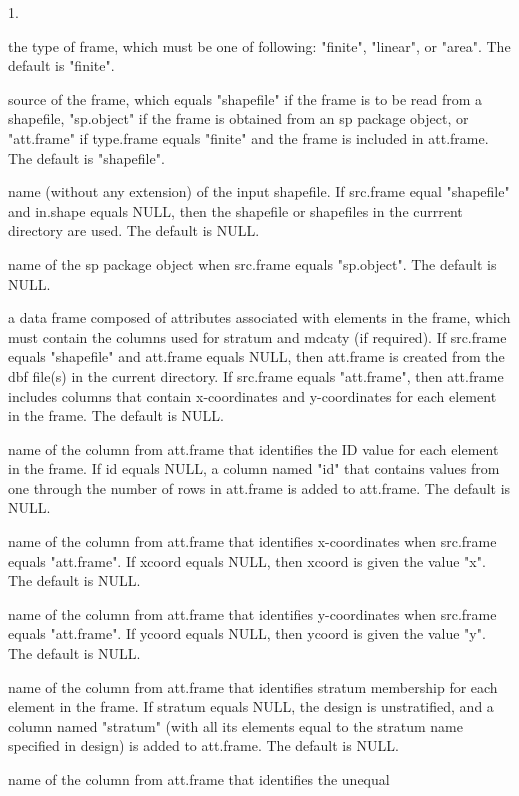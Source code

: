 \begin{Arguments}
\begin{ldescription}
1.
\item[\code{type.frame}] the type of frame, which must be one of following: "finite",
"linear", or "area".  The default is "finite".
\item[\code{src.frame}] source of the frame, which equals "shapefile" if the frame is
to be read from a shapefile, "sp.object" if the frame is obtained from an sp
package object, or "att.frame" if type.frame equals "finite" and the frame
is included in att.frame.  The default is "shapefile".
\item[\code{in.shape}] name (without any extension) of the input shapefile.  If
src.frame equal "shapefile" and in.shape equals NULL, then the shapefile or
shapefiles in the currrent directory are used.  The default is NULL.
\item[\code{sp.object}] name of the sp package object when src.frame equals
"sp.object".  The default is NULL.
\item[\code{att.frame}] a data frame composed of attributes associated with elements
in the frame, which must contain the columns used for stratum and mdcaty (if 
required).  If src.frame equals "shapefile" and att.frame equals NULL, then
att.frame is created from the dbf file(s) in the current directory.  If
src.frame equals "att.frame", then att.frame includes columns that contain
x-coordinates and y-coordinates for each element in the frame.  The default
is NULL.
\item[\code{id}] name of the column from att.frame that identifies the ID value for
each element in the frame.  If id equals NULL, a column named "id" that
contains values from one through the number of rows in att.frame is added to
att.frame.  The default is NULL.
\item[\code{xcoord}] name of the column from att.frame that identifies x-coordinates
when src.frame equals "att.frame".  If xcoord equals NULL, then xcoord is
given the value "x".  The default is NULL.
\item[\code{ycoord}] name of the column from att.frame that identifies y-coordinates
when src.frame equals "att.frame".  If ycoord equals NULL, then ycoord is
given the value "y".  The default is NULL.
\item[\code{stratum}] name of the column from att.frame that identifies stratum
membership for each element in the frame.  If stratum equals NULL, the
design is unstratified, and a column named "stratum" (with all its elements
equal to the stratum name specified in design) is added to att.frame.  The
default is NULL.
\item[\code{mdcaty}] name of the column from att.frame that identifies the unequal

\end{ldescription}
\end{Arguments}
